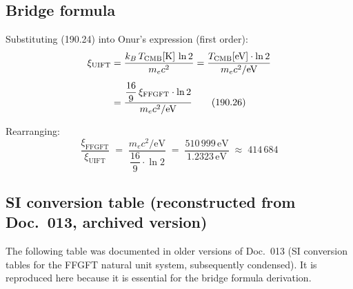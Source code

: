 \subsection*{Bridge formula}

Substituting (190.24) into Onur's expression (first order):
\begin{align}
  \xi_\text{UIFT}
  &= \frac{k_B\,T_\text{CMB}[\text{K}]\,\ln 2}{m_e c^2}
  = \frac{T_\text{CMB}[\text{eV}]\cdot\ln 2}{m_e c^2 / \text{eV}}
  \notag\\[4pt]
  &= \frac{\dfrac{16}{9}\,\xi_\text{FFGFT}\cdot\ln 2}{m_e c^2/\text{eV}}
  \tag{190.26}
\end{align}

Rearranging:
\begin{equation}
  \boxed{
  \frac{\xi_\text{FFGFT}}{\xi_\text{UIFT}}
  \;=\;
  \frac{m_e c^2/\text{eV}}{\dfrac{16}{9}\cdot\ln 2}
  \;=\;
  \frac{510\,999\,\text{eV}}{1.2323\,\text{eV}}
  \;\approx\; 414\,684
  }
  \tag{190.27}
\end{equation}

\subsection*{SI conversion table (reconstructed from Doc.~013, archived version)}

The following table was documented in older versions of Doc.~013
(SI conversion tables for the FFGFT natural unit system, subsequently
condensed). It is reproduced here because it is essential for the
bridge formula derivation.

\begin{center}
\renewcommand{\arraystretch}{1.4}
{\small
{}
}
\end{center}

